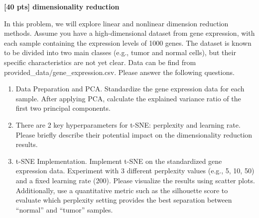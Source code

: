 {\bf [40 pts] dimensionality reduction}

In this problem, we will explore linear and nonlinear dimension reduction methods. Assume you have a high-dimensional dataset from gene expression, with each sample containing the expression levels of 1000 genes. The dataset is known to be divided into two main classes (e.g., tumor and normal cells), but their specific characteristics are not yet clear. Data can be find from provided\_data/gene\_expression.csv. Please answer the following questions. 



\begin{enumerate}[label=(\alph*)]
    \item Data Preparation and PCA. Standardize the gene expression data for each sample. After applying PCA, calculate the explained variance ratio of the first two principal components.
    \begin{solution}
     
    \end{solution}
    \item There are 2 key hyperparameters for t-SNE: perplexity and learning rate. Please briefly describe their potential impact on the dimensionality reduction results.
    \begin{solution}


    \end{solution}
    \item t-SNE Implementation. Implement t-SNE on the standardized gene expression data.
    Experiment with 3 different perplexity values (e.g., 5, 10, 50) and a fixed learning rate (200). Please visualize the results using scatter plots.
    Additionally, use a quantitative metric such as the silhouette score to evaluate which perplexity setting provides the best separation between “normal” and “tumor” samples.

    \begin{solution}

    \end{solution}   

\end{enumerate}





